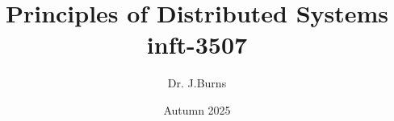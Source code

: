 \newcommand{\MTTF}{\mbox{\emph{MTTF}}}
\newcommand{\MTTR}{\mbox{\emph{MTTR}}}
\newcommand{\MTBF}{\mbox{\emph{MTBF}}}
\newcommand{\set}[1]{\mbox{$\mathbf{#1}$}}
\newcommand{\dollar}{\$}
\newcommand{\mathexpr}[1]{$#1$}
\newcommand{\arc}[1]{{\langle\overrightarrow{#1}\rangle}}

\newcommand{\CP}[2]{\mbox{\mathexpr{\func{CP}_{#1}({#2})}}}
\newcommand{\INT}[2]{\mbox{\mathexpr{\func{INT}_{#1}({#2})}}}
\newcommand{\DEP}[1]{\mbox{\textbf{DEP}(\id{#1})}}
\newcommand{\COPY}[1]{\mbox{\textbf{COPY}(\id{#1})}}
\newcommand{\FAIL}{\mbox{\textbf{FAIL}}}

\newcommand{\lstpath}[1]{}
\newcommand{\setlstpath}[1]{\renewcommand{\lstpath}{#1}}
\newcommand{\includelisting}[1]{}
\newcommand{\oper}[1]{\mbox{$\mathsf{#1}$}}

\newcommand{\lseq}{\mbox{[}}
\newcommand{\rseq}{\mbox{]}}
\newcommand{\sseq}{,\ }


\newcommand{\czero}{}
\newcommand{\ci}{Introduction}
\newcommand{\cii}{Architectures}
\newcommand{\ciii}{Processes}
\newcommand{\civ}{Communication}
\newcommand{\cv}{Coordination}
\newcommand{\cvi}{Naming}
\newcommand{\cvii}{Consistency and Replication}
\newcommand{\cviii}{Fault Tolerance}
\newcommand{\cix}{Security}

\newtheorem{algorithm}{Algorithm}


\title{\textbf{Principles of Distributed Systems} \\ {\small inft-3507}}
\author{Dr. J.Burns}
\date{Autumn 2025}



\graphicspath{{./\figdir\chap/}} %
\setlstpath{./\figdir\chap/}     %

